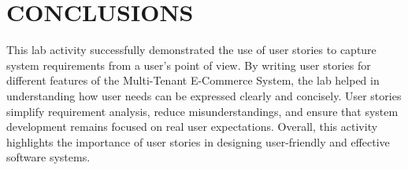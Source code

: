 \chapter{CONCLUSIONS}\label{ch:conclusion}

This lab activity successfully demonstrated the use of user stories to capture system requirements from a user’s point of view. By writing user stories for different features of the Multi-Tenant E-Commerce System, the lab helped in understanding how user needs can be expressed clearly and concisely. User stories simplify requirement analysis, reduce misunderstandings, and ensure that system development remains focused on real user expectations. Overall, this activity highlights the importance of user stories in designing user-friendly and effective software systems.
